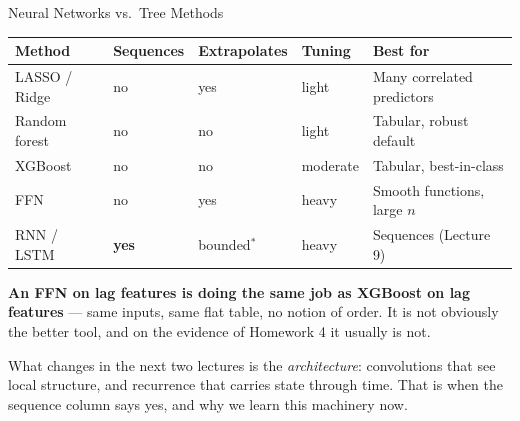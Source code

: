 \documentclass[aspectratio=169, 11pt]{beamer}
\begin{document}
\begin{frame}{Neural Networks vs.\ Tree Methods \parencite{James2021}}
  \begin{center}
    {\small
    \begin{tabular}{lllll}
      \toprule
      \textbf{Method} & \textbf{Sequences} & \textbf{Extrapolates} & \textbf{Tuning} & \textbf{Best for} \\
      \midrule
      LASSO / Ridge & no & yes & light & Many correlated predictors \\
      Random forest & no & no & light & Tabular, robust default \\
      XGBoost & no & no & moderate & Tabular, best-in-class \\
      FFN & no & yes & heavy & Smooth functions, large $n$ \\
      RNN / LSTM & \textbf{yes} & bounded$^{*}$ & heavy & Sequences (Lecture 9) \\
      \bottomrule
    \end{tabular}
    }
  \end{center}
  \vspace{-0.2cm}

  \vspace{0.1cm}
  \textbf{An FFN on lag features is doing the same job as XGBoost on lag features} --- same
  inputs, same flat table, no notion of order. It is not obviously the better tool, and on the
  evidence of Homework 4 it usually is not.

  \vspace{0.15cm}
  What changes in the next two lectures is the \emph{architecture}: convolutions that see local
  structure, and recurrence that carries state through time. That is when the sequence column
  says yes, and why we learn this machinery now.
\end{frame}
\end{document}
